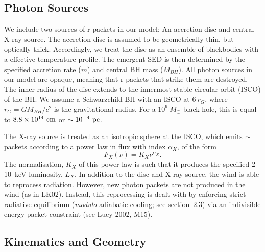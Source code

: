 \documentclass[useAMS,usenatbib]{mn2e_x}
\begin{document}
\subsection{Photon Sources}
\label{sec:photon_sources}

We include two sources of r-packets in our model:
An accretion disc and central X-ray source.
The accretion disc is assumed to be geometrically thin, but optically thick.
Accordingly, we treat the disc as an ensemble of blackbodies with a 
\cite{shakurasunyaev1973} effective temperature profile. 
The emergent SED is then determined by the specified accretion rate ($\dot{m}$)
and central BH mass ($M_{BH}$).
All photon sources in our model are opaque, meaning
that r-packets that strike them are destroyed.
The inner radius of the disc extends to the innermost 
stable circular orbit (ISCO) of the BH. 
We assume a Schwarzchild BH with an ISCO at $6~r_G$, where 
$r_G = GM_{BH}/c^2$ is the gravitational radius.
For a $10^9~M_\odot$ black hole, this is equal to $8.8\times10^{14}~{\rm cm}$ 
or $\sim10^{-4}~{\rm pc}$.  


The X-ray source is treated as an isotropic sphere at the ISCO,
which emits r-packets according to a power law in flux with index $\alpha_X$, of the form
\begin{equation}
F_X (\nu) = K_X \nu^{\alpha_X}.
\end{equation}
The normalisation, $K_X$ of this power law is such that it 
produces the specified 2-10~keV luminosity, $L_X$.
In addition to the disc and X-ray source, 
the wind is able to reprocess radiation. However, new 
photon packets are not produced in the wind (as in LK02). 
Instead, this reprocessing is dealt with by enforcing strict
radiative equilibrium ({\em modulo} adiabatic cooling; see section~2.3)
via an indivisible energy packet
constraint (see Lucy 2002, M15).  

\subsection{Kinematics and Geometry}
\end{document}
